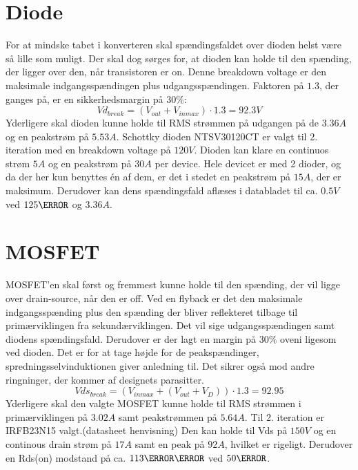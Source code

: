\section{Diode}
For at mindske tabet i konverteren skal spændingsfaldet over dioden helst være så lille som muligt. Der skal dog sørges for, at dioden kan holde til den spænding, der ligger over den, når transistoren er on. Denne breakdown voltage er den maksimale indgangsspændingen plus udgangsspændingen. Faktoren på $1.3$, der ganges på, er en sikkerhedsmargin på $30\percent$:
\begin{equation} \label{Vd_break}
Vd_{break} = (V_{out}+V_{inmax}) \cdot 1.3 = 92.3V
\end{equation}
Yderligere skal dioden kunne holde til RMS strømmen på udgangen på de $3.36A$ og en peakstrøm på $5.53A$.
Schottky dioden NTSV30120CT er valgt til 2. iteration med en breakdown voltage på $120V$. Dioden kan klare en continuos strøm $5A$ og en peakstrøm på $30A$ per device. Hele devicet er med 2 dioder, og da der her kun benyttes én af dem, er det i stedet en peakstrøm på $15A$, der er maksimum. Derudover kan dens spændingsfald aflæses i databladet til ca. $0.5V$ ved $125\degreeCelsius$ og $3.36A$. 

\section{MOSFET}
MOSFET'en skal først og fremmest kunne holde til den spænding, der vil ligge over drain-source, når den er off. Ved en flyback er det den maksimale indgangsspænding plus den spænding der bliver reflekteret tilbage til primærviklingen fra sekundærviklingen. Det vil sige udgangsspændingen samt diodens spændingsfald. Derudover er der lagt en margin på $30\percent$ oveni ligesom ved dioden. Det er for at tage højde for de peakspændinger, spredningsselvinduktionen giver anledning til. Det sikrer også mod andre ringninger, der kommer af designets parasitter.  
\begin{equation} \label{Vds_break}
Vds_{break} = (V_{inmax}+(V_{out}+V_D)) \cdot 1.3 = 92.95
\end{equation}
Yderligere skal den valgte MOSFET kunne holde til RMS strømmen i primærviklingen på $3.02A$ samt peakstrømmen på $5.64A$.
Til 2. iteration er IRFB23N15 valgt.(datasheet henvisning) Den kan holde til Vds på $150V$ og en continous drain strøm på $17A$ samt en peak på $92A$, hvilket er rigeligt. Derudover en Rds(on) modstand på ca. $113\milli \ohm$ ved $50\degreeCelsius$. 

